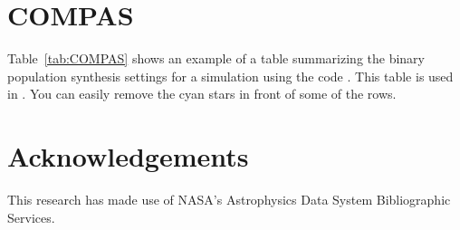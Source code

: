 \documentclass[fleqn,usenatbib, onecolumn]{mnras}
\begin{document}
\section{COMPAS}
Table~\ref{tab:COMPAS} shows an example of a table summarizing the binary population synthesis settings for a simulation using the code {}. This table is used in \citet{2021arXiv210302608B}. You can easily remove the cyan stars in front of some of the rows. 



\section*{Acknowledgements}
This research has made use of NASA’s Astrophysics Data System Bibliographic Services.


\vspace{10cm}
\end{document}
